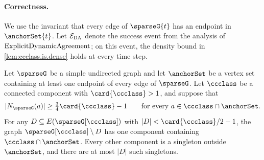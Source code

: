\paragraph{Correctness.}
\label{par:correctness}
We use the invariant that every edge of $ \sparseG{t} $ has an endpoint in $ \anchorSet{t} $.
Let $ \mathcal{E}_{\rm DA} $ denote the success event from the analysis of $ \mathrm{ExplicitDynamicAgreement} $; on this event, the density bound in \cref{lem:ccclass.is.dense} holds at every time step.

\begin{lemma} \label{lem:labelsync.robust.components}
Let $ \sparseG $ be a simple undirected graph and let $ \anchorSet $ be a vertex set containing at least one endpoint of every edge of $ \sparseG $.
Let $ \ccclass $ be a connected component with $ \card{\ccclass}>1 $, and suppose that
\[
  |\openN{\sparseG}{a}|\ge\tfrac34\card{\ccclass}-1
  \qquad\text{for every }a\in \ccclass\cap\anchorSet.
\]
For any $ D\subseteq E(\sparseG[\ccclass]) $ with $ |D|<\card{\ccclass}/2-1 $, the graph $ \sparseG[\ccclass]\setminus D $ has one component containing $ \ccclass\cap\anchorSet $.
Every other component is a singleton outside $ \anchorSet $, and there are at most $ |D| $ such singletons.
\end{lemma}
